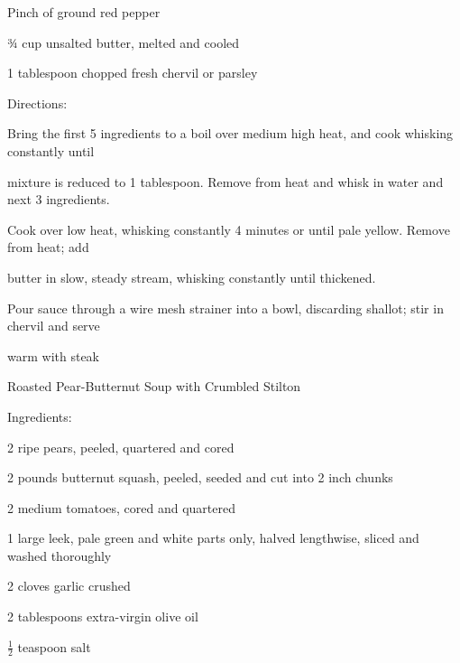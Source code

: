 \documentclass[a4paper,portrait,12pt]{book}
\begin{document}
Pinch of ground red pepper




¾ cup unsalted butter, melted and cooled




1 tablespoon chopped fresh chervil or parsley




Directions:




Bring the first 5 ingredients to a boil over medium high heat, and cook whisking constantly until




mixture is reduced to 1 tablespoon. Remove from heat and whisk in water and next 3 ingredients.




Cook over low heat, whisking constantly 4 minutes or until pale yellow. Remove from heat; add




butter in slow, steady stream, whisking constantly until thickened.




Pour sauce through a wire mesh strainer into a bowl, discarding shallot; stir in chervil and serve




warm with steak







\newpage
Roasted Pear-Butternut Soup with Crumbled Stilton




Ingredients:




2 ripe pears, peeled, quartered and cored




2 pounds butternut squash, peeled, seeded and cut into 2 inch chunks




2 medium tomatoes, cored and quartered




1 large leek, pale green and white parts only, halved lengthwise, sliced and washed thoroughly




2 cloves garlic crushed




2 tablespoons extra-virgin olive oil




$\frac{1}{2}$ teaspoon salt
\end{document}

